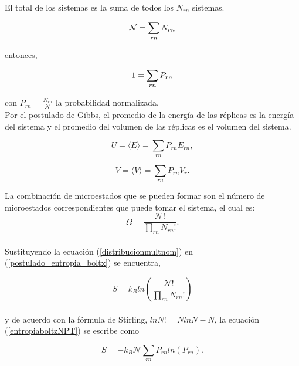 El total de los sistemas es la suma de todos los $N_{rn}$ sistemas.

\begin{equation} \label{conteoprobNPT}
    \mathcal{N} = \sum_{rn} N_{rn} \\
\end{equation}

entonces,

\begin{equation} \label{restrprobNPT}
    1 = \sum_{rn} P_{rn} \\
\end{equation}

con $P_{rn} = \frac{N_{rn}}{\mathcal{N}}$ la probabilidad normalizada.\\

Por el postulado de Gibbs, el promedio de la energía de las réplicas es la energía del sistema y el promedio del volumen de las réplicas es el volumen del sistema.

\begin{equation} \label{energiaprobNPT}
    U = \langle E\rangle = \sum_{rn} P_{rn} E_{rn},
\end{equation}

\begin{equation} \label{volprobNPT}
    V = \langle V\rangle = \sum_{rn} P_{rn} V_r.
\end{equation}

La combinación de microestados que se pueden formar son el número de microestados correspondientes que puede tomar el sistema, el cual es:\\

\begin{equation} \label{distribucionmultnom}
    \Omega = \frac{\mathcal{N}!}{\prod_{rn} N_{rn}!}.
\end{equation}\\

Sustituyendo la ecuación (\ref{distribucionmultnom}) en (\ref{postulado_entropia_boltx}) se encuentra,

\begin{equation}  \label{entropiaboltzNPT}
    S = k_{B}ln\left(\frac{\mathcal{N}!}{\prod_{rn} N_{rn}!}\right) 
\end{equation}\\

y de acuerdo con la fórmula de Stirling, $lnN!=NlnN-N$, la ecuación (\ref{entropiaboltzNPT}) se escribe como

\begin{equation}  \label{entropiaboltzNPTstirling}
    S =  -k_{B}\mathcal{N}\sum_{rn} P_{rn} ln(P_{rn}).
\end{equation}\\

